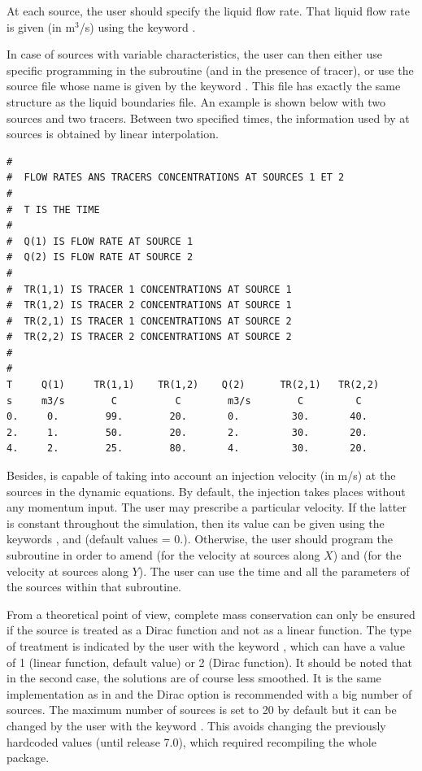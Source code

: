 At each source, the user should specify the liquid flow rate. That liquid flow
rate is given (in m${}^{3}$/s) using the keyword .

In case of sources with variable characteristics, the user can then either use
specific programming in the  subroutine (and
 in the presence of tracer), or use the source file
whose name is given by the keyword .
This file has exactly the same structure as the liquid
boundaries file. An example is shown below with two sources and two tracers.
Between two specified times, the information used by  at sources is
obtained by linear interpolation.

\begin{lstlisting}[language=TelemacCas]
#
#  FLOW RATES ANS TRACERS CONCENTRATIONS AT SOURCES 1 ET 2
#
#  T IS THE TIME
#
#  Q(1) IS FLOW RATE AT SOURCE 1
#  Q(2) IS FLOW RATE AT SOURCE 2
#
#  TR(1,1) IS TRACER 1 CONCENTRATIONS AT SOURCE 1
#  TR(1,2) IS TRACER 2 CONCENTRATIONS AT SOURCE 1
#  TR(2,1) IS TRACER 1 CONCENTRATIONS AT SOURCE 2
#  TR(2,2) IS TRACER 2 CONCENTRATIONS AT SOURCE 2
#
#
T     Q(1)     TR(1,1)    TR(1,2)    Q(2)      TR(2,1)   TR(2,2)
s     m3/s        C          C        m3/s        C         C
0.     0.        99.        20.       0.         30.       40.
2.     1.        50.        20.       2.         30.       20.
4.     2.        25.        80.       4.         30.       20.
\end{lstlisting}

Besides,  is capable of taking into account an injection velocity (in
m/s) at the sources in the dynamic equations. By default, the injection takes
places without any momentum input. The user may prescribe a particular
velocity. If the latter is constant throughout the simulation, then its value
can be given using the keywords ,
 and
 (default values = 0.).
Otherwise, the user should program the  subroutine
in order to amend  (for the
velocity at sources along $X$) and  (for the velocity at sources
along $Y$). The user can use the time and all the parameters of the sources
within that subroutine.

From a theoretical point of view, complete mass conservation can only be ensured
if the source is treated as a Dirac function and not as a linear function.
The type of treatment is indicated by the user with the keyword
, which can have a value of 1 (linear function,
default value) or 2 (Dirac function).
It should be noted that in the second case, the solutions are of course
less smoothed.
It is the same implementation as in  and the Dirac option is
recommended with a big number of sources.
The maximum number of sources is set to 20 by default but it can be changed
by the user with the keyword .
This avoids changing the previously hardcoded values (until release 7.0),
which required recompiling the whole package.

